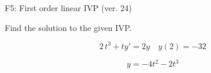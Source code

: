 \begin{exercise}
  \begin{exerciseTitle}F5: First order linear IVP (ver. 24)\end{exerciseTitle}
  \begin{exerciseStatement}
    
Find the solution to the given IVP.

    
\[2 \, t^{3} +ty'= 2 y \hspace{1em} y( 2 ) = -32\]

  \end{exerciseStatement}
  \begin{exerciseAnswer}
    
\[y= -4 t^ 2 -2 t^{3}\]

  \end{exerciseAnswer}
\end{exercise}